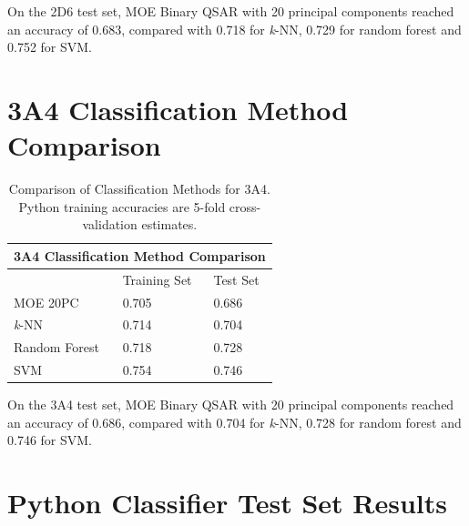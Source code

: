 On the 2D6 test set, MOE Binary QSAR with 20 principal components reached an accuracy of 0.683, compared with 0.718 for \textit{k}-NN, 0.729 for random forest and 0.752 for SVM.


\section{3A4 Classification Method Comparison}

\begin{table}[H]
\caption[Comparison of Classification Methods for 3A4]{Comparison of Classification Methods for 3A4. Python training accuracies are 5-fold cross-validation estimates.}
\centering
\begin{tabular}{|l|l|l|}
\hline
\multicolumn{3}{|c|}{3A4 Classification Method Comparison} \\ \hline
          & Training Set & Test Set \\ \hline
MOE 20PC  & 0.705        & 0.686    \\ \hline
\textit{k}-NN    & 0.714        & 0.704    \\ \hline
Random Forest & 0.718    & 0.728    \\ \hline
SVM       & 0.754        & 0.746    \\ \hline
\end{tabular}
\end{table}

On the 3A4 test set, MOE Binary QSAR with 20 principal components reached an accuracy of 0.686, compared with 0.704 for \textit{k}-NN, 0.728 for random forest and 0.746 for SVM.


\section{Python Classifier Test Set Results}\label{sec:pytest}

